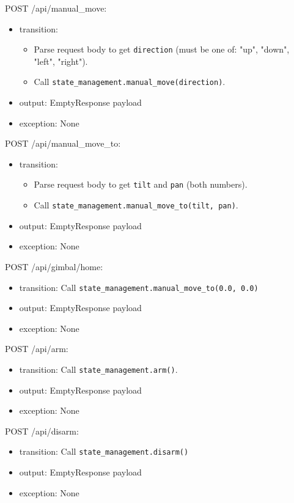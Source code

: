 \documentclass[12pt, titlepage]{article}
\begin{document}
\noindent POST /api/manual\_move:
\begin{itemize}
  \item transition:
        \begin{itemize}
          \item Parse request body to get \texttt{direction} (must be one of: "up", "down",
                "left", "right").
          \item Call \texttt{state\_management.manual\_move(direction)}.
        \end{itemize}
  \item output: EmptyResponse payload
  \item exception: None
\end{itemize}

\noindent POST /api/manual\_move\_to:
\begin{itemize}
  \item transition:
        \begin{itemize}
          \item Parse request body to get \texttt{tilt} and \texttt{pan} (both numbers).
          \item Call \texttt{state\_management.manual\_move\_to(tilt, pan)}.
        \end{itemize}
  \item output: EmptyResponse payload
  \item exception: None
\end{itemize}

\noindent POST /api/gimbal/home:
\begin{itemize}
  \item transition: Call \texttt{state\_management.manual\_move\_to(0.0, 0.0)}
  \item output: EmptyResponse payload
  \item exception: None
\end{itemize}

\noindent POST /api/arm:
\begin{itemize}
  \item transition: Call \texttt{state\_management.arm()}.
  \item output: EmptyResponse payload
  \item exception: None
\end{itemize}

\noindent POST /api/disarm:
\begin{itemize}
  \item transition: Call \texttt{state\_management.disarm()}
  \item output: EmptyResponse payload
  \item exception: None
\end{itemize}
\end{document}
